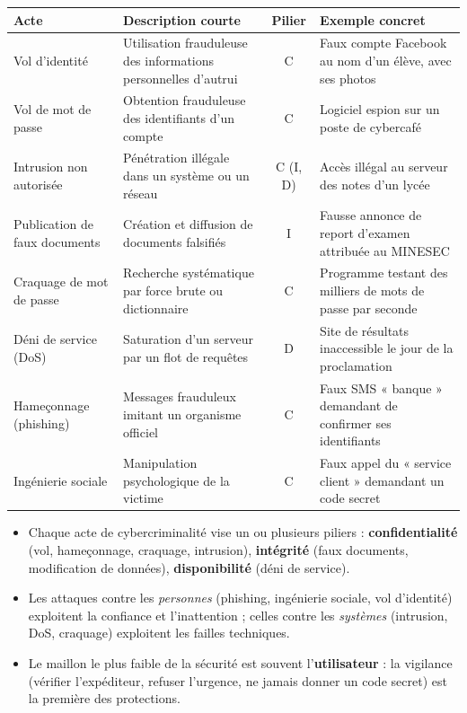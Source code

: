 \documentclass[11pt]{article}
\begin{document}
\begin{center}
\begin{tabularx}{\linewidth}{|l|X|c|X|}
\hline
\rowcolor{popblueL}
\textbf{Acte} & \textbf{Description courte} & \textbf{Pilier} & \textbf{Exemple concret} \\
\hline
Vol d'identité & Utilisation frauduleuse des informations personnelles d'autrui & C & Faux compte Facebook au nom d'un élève, avec ses photos \\
\hline
Vol de mot de passe & Obtention frauduleuse des identifiants d'un compte & C & Logiciel espion sur un poste de cybercafé \\
\hline
Intrusion non autorisée & Pénétration illégale dans un système ou un réseau & C (I, D) & Accès illégal au serveur des notes d'un lycée \\
\hline
Publication de faux documents & Création et diffusion de documents falsifiés & I & Fausse annonce de report d'examen attribuée au MINESEC \\
\hline
Craquage de mot de passe & Recherche systématique par force brute ou dictionnaire & C & Programme testant des milliers de mots de passe par seconde \\
\hline
Déni de service (DoS) & Saturation d'un serveur par un flot de requêtes & D & Site de résultats inaccessible le jour de la proclamation \\
\hline
Hameçonnage (phishing) & Messages frauduleux imitant un organisme officiel & C & Faux SMS « banque » demandant de confirmer ses identifiants \\
\hline
Ingénierie sociale & Manipulation psychologique de la victime & C & Faux appel du « service client » demandant un code secret \\
\hline
\end{tabularx}
\end{center}

\begin{aretenir}[L'essentiel]
\begin{itemize}
\item Chaque acte de cybercriminalité vise un ou plusieurs piliers : \textbf{confidentialité} (vol, hameçonnage, craquage, intrusion), \textbf{intégrité} (faux documents, modification de données), \textbf{disponibilité} (déni de service).
\item Les attaques contre les \emph{personnes} (phishing, ingénierie sociale, vol d'identité) exploitent la confiance et l'inattention ; celles contre les \emph{systèmes} (intrusion, DoS, craquage) exploitent les failles techniques.
\item Le maillon le plus faible de la sécurité est souvent l'\textbf{utilisateur} : la vigilance (vérifier l'expéditeur, refuser l'urgence, ne jamais donner un code secret) est la première des protections.
\end{itemize}
\end{aretenir}
\end{document}
